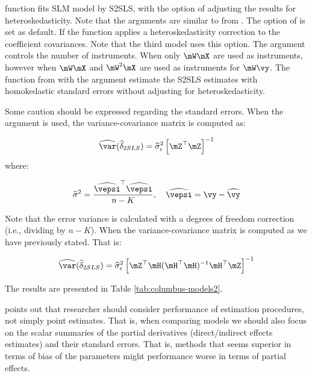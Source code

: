 \documentclass[english,12pt]{book}\usepackage[]{graphicx}\usepackage[]{xcolor}
\begin{document}
 function fits SLM model by S2SLS, with the option of adjusting the results for heteroskedasticity. Note that the arguments are similar to  from . The  option of  is set  as default. If  the function applies a heteroskedasticity correction to the coefficient covariances. Note that the third model  uses this option. The argument  controls the number of instruments. When  only $\mW\mX$ are used as instruments, however when   $\mW\mX$ and $\mW^2\mX$ are used as instruments for $\mW\vy$. The function  from  with the argument  estimate the S2SLS estimates with homokedastic standard errors without adjusting for heteroskedasticity.

Some caution should be expressed regarding the standard errors. When the argument  is used, the variance-covariance matrix is computed as:


\begin{equation*}
\widehat{\var}(\widehat{\delta}_{2SLS}) = \widehat{\sigma}^2_{\epsilon}\left[\mZ^\top\mZ\right]^{-1}
\end{equation*}
%
where:

\begin{equation*}
  \widehat{\sigma}^2 = \frac{\widehat{\vepsi}^\top\widehat{\vepsi}}{n - K},\quad \widehat{\vepsi} = \vy - \widehat{\vy}
\end{equation*}

Note that the error variance is calculated with a degrees of freedom correction (i.e., dividing by $n-K$). When   the variance-covariance matrix is computed as we have previously stated. That is:

\begin{equation*}
\widehat{\var}(\widehat{\delta}_{2SLS}) = \widehat{\sigma}^2_{\epsilon}\left[\mZ^\top \mH (\mH^\top\mH)^{-1}\mH^\top\mZ\right]^{-1}
\end{equation*}

The results are presented in Table \ref{tab:columbus-models2}.

\citet[][pag. 24]{lesage2014regional} points out that researcher should consider performance of estimation procedures, not simply point estimates. That is, when comparing models we should also focus on the scalar summaries of the partial derivatives (direct/indirect effects estimates) and their standard errors. That is, methods that seems superior in terms of bias of the parameters might performance worse in terms of partial effects. 
\end{document}
